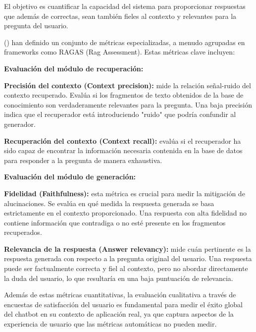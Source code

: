 {{El objetivo es cuantificar la capacidad del sistema para proporcionar respuestas que además de correctas, sean también fieles al contexto y relevantes para la pregunta del usuario.

(\cite{es2023ragas}) han definido un conjunto de métricas especializadas, a menudo agrupadas en frameworks como RAGAS (Rag Assessment). Estas métricas clave incluyen:

\begin{listaenumerada}
    \item \textbf{Evaluación del módulo de recuperación:}
    \begin{lista}
        \item \textbf{Precisión del contexto (Context precision):} mide la relación señal-ruido del contexto recuperado. Evalúa si los fragmentos de texto obtenidos de la base de conocimiento son verdaderamente relevantes para la pregunta. Una baja precisión indica que el recuperador está introduciendo "ruido" que podría confundir al generador.
        \item \textbf{Recuperación del contexto (Context recall):} evalúa si el recuperador ha sido capaz de encontrar la información necesaria contenida en la base de datos para responder a la pregunta de manera exhaustiva.
    \end{lista}
    \item \textbf{Evaluación del módulo de generación:}
    \begin{lista}
        \item \textbf{Fidelidad (Faithfulness):} esta métrica es crucial para medir la mitigación de alucinaciones. Se evalúa en qué medida la respuesta generada se basa estrictamente en el contexto proporcionado. Una respuesta con alta fidelidad no contiene información que contradiga o no esté presente en los fragmentos recuperados.
        \item \textbf{Relevancia de la respuesta (Answer relevancy):} mide cuán pertinente es la respuesta generada con respecto a la pregunta original del usuario. Una respuesta puede ser factualmente correcta y fiel al contexto, pero no abordar directamente la duda del usuario, lo que resultaría en una baja puntuación de relevancia.
    \end{lista}
\end{listaenumerada}

Además de estas métricas cuantitativas, la evaluación cualitativa a través de encuestas de satisfacción del usuario es fundamental para medir el éxito global del chatbot en su contexto de aplicación real, ya que captura aspectos de la experiencia de usuario que las métricas automáticas no pueden medir.

}}
